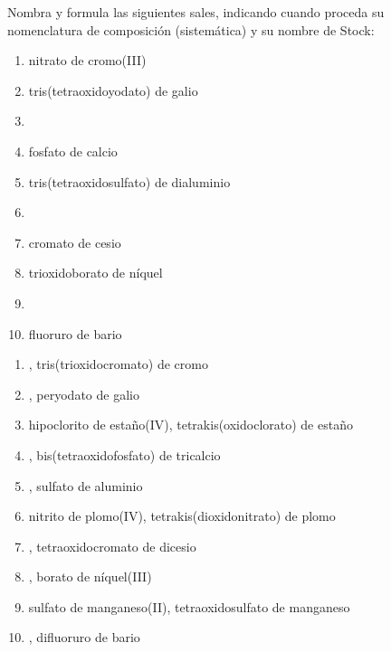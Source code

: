 \begin{exercise}[
    tags    = {inorgánica,sales, sales binarias,sales ternarias},
    topics  = {química inorgánica,formulación,nomenclatura},
    source  = {SAN Formulación, p29, e38},
  ]
  Nombra y formula las siguientes sales, indicando cuando proceda su nomenclatura de composición (sistemática) y su nombre de Stock:

  \begin{enumerate}
    \item nitrato de cromo(III)
    \item tris(tetraoxidoyodato) de galio
    \item {}
    \item fosfato de calcio
    \item tris(tetraoxidosulfato) de dialuminio
    \item {}
    \item cromato de cesio
    \item trioxidoborato de níquel
    \item {}
    \item fluoruro de bario
  \end{enumerate}
\end{exercise}

\begin{solution}
  \begin{enumerate}
    \item {}, tris(trioxidocromato) de cromo
    \item {}, peryodato de galio
    \item hipoclorito de estaño(IV), tetrakis(oxidoclorato) de estaño
    \item {}, bis(tetraoxidofosfato) de tricalcio
    \item {}, sulfato de aluminio
    \item nitrito de plomo(IV), tetrakis(dioxidonitrato) de plomo
    \item {}, tetraoxidocromato de dicesio
    \item {}, borato de níquel(III)
    \item sulfato de manganeso(II), tetraoxidosulfato de manganeso
    \item {}, difluoruro de bario
  \end{enumerate}
\end{solution}





